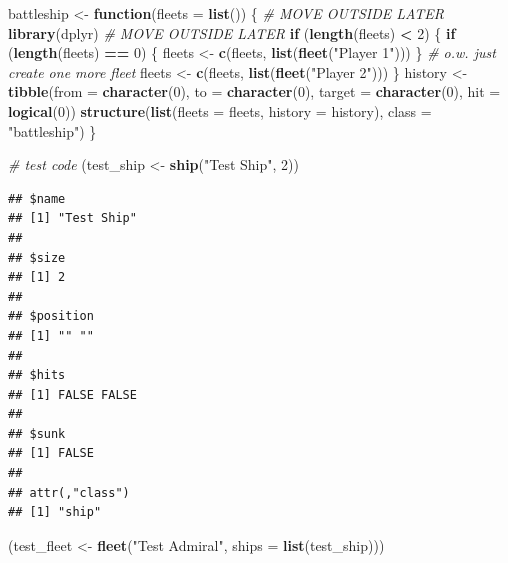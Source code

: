 \documentclass[
]{article}
\newenvironment{Shaded}{\begin{snugshade}}{\end{snugshade}}
\newcommand{\AttributeTok}[1]{\textcolor[rgb]{0.13,0.29,0.53}{#1}}
\newcommand{\CommentTok}[1]{\textcolor[rgb]{0.56,0.35,0.01}{\textit{#1}}}
\newcommand{\ControlFlowTok}[1]{\textcolor[rgb]{0.13,0.29,0.53}{\textbf{#1}}}
\newcommand{\DecValTok}[1]{\textcolor[rgb]{0.00,0.00,0.81}{#1}}
\newcommand{\FunctionTok}[1]{\textcolor[rgb]{0.13,0.29,0.53}{\textbf{#1}}}
\newcommand{\NormalTok}[1]{#1}
\newcommand{\OtherTok}[1]{\textcolor[rgb]{0.56,0.35,0.01}{#1}}
\newcommand{\SpecialCharTok}[1]{\textcolor[rgb]{0.81,0.36,0.00}{\textbf{#1}}}
\newcommand{\StringTok}[1]{\textcolor[rgb]{0.31,0.60,0.02}{#1}}
\begin{document}
\begin{Shaded}
\begin{Highlighting}[]
\NormalTok{battleship }\OtherTok{\textless{}{-}} \ControlFlowTok{function}\NormalTok{(}\AttributeTok{fleets =} \FunctionTok{list}\NormalTok{()) \{ }
  \CommentTok{\# MOVE OUTSIDE LATER}
  \FunctionTok{library}\NormalTok{(dplyr)}
  \CommentTok{\# MOVE OUTSIDE LATER}
  \ControlFlowTok{if}\NormalTok{ (}\FunctionTok{length}\NormalTok{(fleets) }\SpecialCharTok{\textless{}} \DecValTok{2}\NormalTok{) \{}
    \ControlFlowTok{if}\NormalTok{ (}\FunctionTok{length}\NormalTok{(fleets) }\SpecialCharTok{==} \DecValTok{0}\NormalTok{) \{}
\NormalTok{      fleets }\OtherTok{\textless{}{-}} \FunctionTok{c}\NormalTok{(fleets, }\FunctionTok{list}\NormalTok{(}\FunctionTok{fleet}\NormalTok{(}\StringTok{"Player 1"}\NormalTok{)))}
\NormalTok{    \} }\CommentTok{\# o.w. just create one more fleet}
\NormalTok{    fleets }\OtherTok{\textless{}{-}} \FunctionTok{c}\NormalTok{(fleets, }\FunctionTok{list}\NormalTok{(}\FunctionTok{fleet}\NormalTok{(}\StringTok{"Player 2"}\NormalTok{)))}
\NormalTok{  \}}
\NormalTok{  history }\OtherTok{\textless{}{-}} \FunctionTok{tibble}\NormalTok{(}\AttributeTok{from =} \FunctionTok{character}\NormalTok{(}\DecValTok{0}\NormalTok{), }\AttributeTok{to =} \FunctionTok{character}\NormalTok{(}\DecValTok{0}\NormalTok{), }
                    \AttributeTok{target =} \FunctionTok{character}\NormalTok{(}\DecValTok{0}\NormalTok{), }\AttributeTok{hit =} \FunctionTok{logical}\NormalTok{(}\DecValTok{0}\NormalTok{))}
  \FunctionTok{structure}\NormalTok{(}\FunctionTok{list}\NormalTok{(}\AttributeTok{fleets =}\NormalTok{ fleets, }\AttributeTok{history =}\NormalTok{ history), }\AttributeTok{class =} \StringTok{"battleship"}\NormalTok{)}
\NormalTok{\}}
\end{Highlighting}
\end{Shaded}

\begin{Shaded}
\begin{Highlighting}[]
\CommentTok{\# test code}
\NormalTok{(test\_ship }\OtherTok{\textless{}{-}} \FunctionTok{ship}\NormalTok{(}\StringTok{"Test Ship"}\NormalTok{, }\DecValTok{2}\NormalTok{))}
\end{Highlighting}
\end{Shaded}

\begin{verbatim}
## $name
## [1] "Test Ship"
## 
## $size
## [1] 2
## 
## $position
## [1] "" ""
## 
## $hits
## [1] FALSE FALSE
## 
## $sunk
## [1] FALSE
## 
## attr(,"class")
## [1] "ship"
\end{verbatim}

\begin{Shaded}
\begin{Highlighting}[]
\NormalTok{(test\_fleet }\OtherTok{\textless{}{-}} \FunctionTok{fleet}\NormalTok{(}\StringTok{"Test Admiral"}\NormalTok{, }\AttributeTok{ships =} \FunctionTok{list}\NormalTok{(test\_ship)))}
\end{Highlighting}
\end{Shaded}
\end{document}

